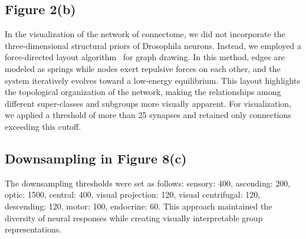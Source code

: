 \documentclass{article}
\theoremstyle{plain}
\theoremstyle{definition}
\theoremstyle{remark}
\begin{document}
\subsection{Figure 2(b)}

In the visualization of the network of connectome, we did not incorporate the three-dimensional structural priors of Drosophila neurons. Instead, we employed a force-directed layout algorithm~\citep{Kobourov2012} for graph drawing. In this method, edges are modeled as springs while nodes exert repulsive forces on each other, and the system iteratively evolves toward a low-energy equilibrium. This layout highlights the topological organization of the network, making the relationships among different super-classes and subgroups more visually apparent. For visualization, we applied a threshold of more than 25 synapses and retained only connections exceeding this cutoff.

\subsection{Downsampling in Figure 8(c)}
\label{app:Dawnsampling}

The downsampling thresholds were set as follows: sensory: 400, ascending: 200, optic: 1500, central: 400, visual projection: 120, visual centrifugal: 120, descending: 120, motor: 100, endocrine: 60. This approach maintained the diversity of neural responses while creating visually interpretable group representations.
\end{document}
